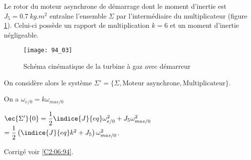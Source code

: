 Le rotor du moteur asynchrone de démarrage dont le moment d’inertie est $J_5=\SI{0,7}{kg.m^2}$ entraîne
 l’ensemble $\Sigma$ par l’intermédiaire du multiplicateur (figure \ref{fig_94_03}). Celui-ci possède un rapport de multiplication $k=6$ et un moment d’inertie négligeable.
 
 \begin{figure}[!h]
\texttt{[image: 94\_03]}
\caption{Schéma cinématique de la turbine à gaz avec démarreur \label{fig_94_03}}
\end{figure}

On considère alors le système $\Sigma' = \{ \Sigma, \text{Moteur asynchrone}, \text{Multiplicateur}\}$.
 

\begin{corrige}
On a $\omega_{e/0} = k \omega_{mas/0}$

$\ec{\Sigma'}{0} = \dfrac{1}{2}\indice{J}{eq} \omega_{e/0}^2 + J_5 \omega_{mas/0}^2$
$=\dfrac{1}{2}\left(\indice{J}{eq} k^2 + J_5\right) \omega_{mas/0}^2$.

 
\end{corrige}

 

 

\ifprof
\else
\begin{flushright}
\footnotesize{Corrigé  voir \ref{C2:06:94}.}
\end{flushright}%
\fi
